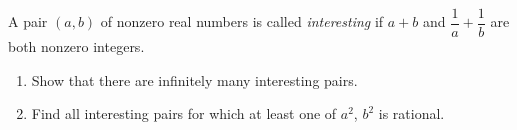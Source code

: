 A pair $(a,b)$ of nonzero real numbers is called \emph{interesting} if $a+b$ and $\dfrac{1}{a}+\dfrac{1}{b}$ are both nonzero integers.
\begin{enumerate}
\item[(a)] Show that there are infinitely many interesting pairs.
\item[(b)] Find all interesting pairs for which at least one of $a^2$, $b^2$ is rational.
\end{enumerate}
